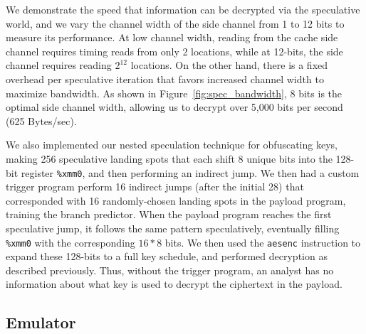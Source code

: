 We demonstrate the speed that information can be decrypted via the speculative
world, and we vary the channel width of the side channel from 1 to 12 bits to
measure its performance. At low channel width, reading from the cache side
channel requires timing reads from only 2 locations, while at 12-bits, the side
channel requires reading $2^{12}$ locations. On the other hand, there is a fixed
overhead per speculative iteration that favors increased channel width to
maximize bandwidth. As shown in Figure~\ref{fig:spec_bandwidth}, 8 bits is the
optimal side channel width, allowing us to decrypt over 5,000 bits per second
(625 Bytes/sec).


\smallskip

We also implemented our nested speculation technique for obfuscating keys,
making 256 speculative landing spots that each shift 8 unique bits into the
128-bit register \texttt{\%xmm0}, and then performing an indirect jump. We then
had a custom trigger program perform 16 indirect jumps (after the initial 28)
that corresponded with 16 randomly-chosen landing spots in the payload program,
training the branch predictor. When the payload program reaches the first
speculative jump, it follows the same pattern speculatively, eventually filling
\texttt{\%xmm0} with the corresponding $16*8$ bits. We then used the
\texttt{aesenc} instruction to expand these 128-bits to a full key schedule, and
performed decryption as described previously. Thus, without the trigger program,
an analyst has no information about what key is used to decrypt the ciphertext
in the payload.




\FigSpecBandwidth

\subsection{Emulator}
\label{subsec:spasm}


